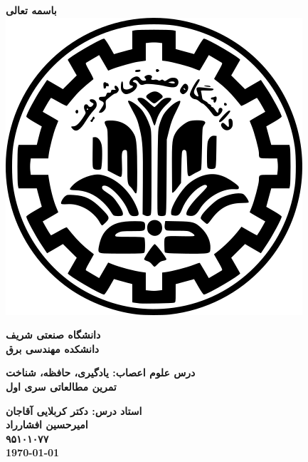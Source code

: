 \documentclass[a4paper]{article}
\begin{document}
	
\begin{titlepage}
	
	\begin{center}
		\textbf{
			باسمه تعالی\\
		}
		\vspace{2cm}
		\includegraphics[scale=0.25]{logo.png}\\
		\vspace{0.5cm}
		\begin{Large}
			\textbf{
				دانشگاه صنعتی شریف\\
				\vspace{0.5cm}
				دانشکده مهندسی برق\\
			}
		\end{Large}
		\vspace{2.5cm}
		\begin{huge}
			\textbf{
				درس علوم اعصاب: یادگیری، حافظه، شناخت\\
				\vspace{1cm}
				تمرین مطالعاتی سری اول\\
			}
		\end{huge}
		\vspace{1.5cm}
		\begin{Large}
			\textbf{
				استاد درس: دکتر کربلایی آقاجان\\
				\vspace{1.5cm}
				امیرحسین افشارراد\\
				\vspace{0.5cm}
				۹۵۱۰۱۰۷۷\\
				\vspace{2cm}
				\today
			}
		\end{Large}
		
	\end{center}
	
	\thispagestyle{empty}
\end{titlepage}	
\end{document}
